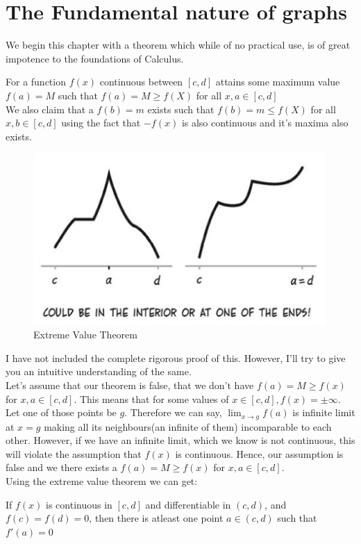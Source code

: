 \section{The Fundamental nature of graphs}
We begin this chapter with a theorem which while of no practical use, is of great impotence to the foundations of Calculus.\\
\begin{theorem}
    For a function $f(x)$ continuous between $[c,d]$ attains some maximum value $f(a)=M$ such that $f(a)=M\geq f(X)$ for all $x,a \in [c,d]$\\
    We also claim that a $f(b)=m$ exists such that $f(b)=m\leq f(X)$ for all $x,b \in [c,d]$ using the fact that $-f(x)$ is also continuous and it's maxima also exists.
    \begin{figure} [H]
        \centering
        \includegraphics[width=0.5\linewidth]{Photos/Extreme value theorem.png}
        \caption{Extreme Value Theorem}
        
    \end{figure}
\end{theorem}
I have not included the complete rigorous proof of this. However, I'll try to give you an intuitive understanding of the same.\\
Let's assume that our theorem is false, that we don't have $f(a)=M \geq f(x)$ for $x,a \in [c,d]$. This means that for some values of $x \in [c,d], f(x)=\pm \infty$. Let one of those points be $g$. Therefore we can say, $\lim_{x \to g}f(a)$ is infinite limit at $x=g$ making all its neighbours(an infinite of them) incomparable to each other. However, if we have an infinite limit, which we know is not continuous, this will violate the assumption that $f(x)$ is continuous. Hence, our assumption is false and we there exists a $f(a)=M \geq f(x)$ for $x,a \in [c,d]$.\\
Using the extreme value theorem we can get:\\
\begin{theorem}
    If $f(x)$ is continuous in $[c,d]$ and differentiable in $(c,d)$, and $f(c)=f(d)=0$, then there is atleast one point $a \in (c,d)$ such that $f'(a)=0$\\
\end{theorem}
